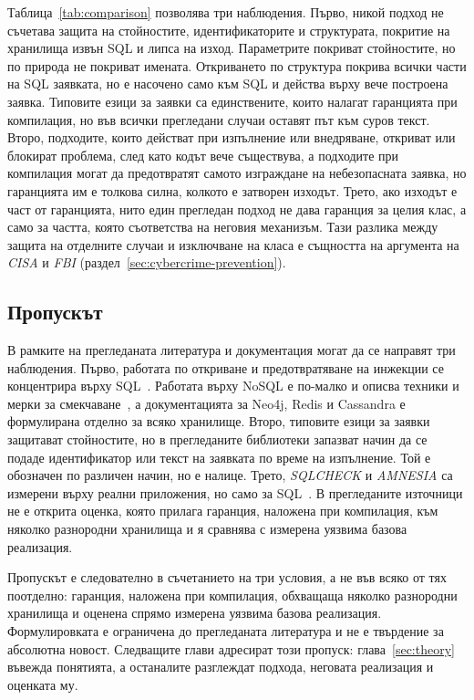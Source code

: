 Таблица~\ref{tab:comparison} позволява три наблюдения. Първо, никой подход не
съчетава защита на стойностите, идентификаторите и структурата, покритие на хранилища
извън SQL и липса на изход. Параметрите покриват стойностите, но по природа не покриват
имената. Откриването по структура покрива всички части на SQL заявката, но е насочено
само към SQL и действа върху вече построена заявка. Типовите езици за заявки са
единствените, които налагат гаранцията при компилация, но във всички прегледани
случаи оставят път към суров текст. Второ, подходите, които действат при изпълнение
или внедряване, откриват или блокират проблема, след като кодът вече съществува, а
подходите при компилация могат да предотвратят самото изграждане на небезопасната
заявка, но гаранцията им е толкова силна, колкото е затворен изходът. Трето, ако
изходът е част от гаранцията, нито един прегледан подход не дава гаранция за целия
клас, а само за частта, която съответства на неговия механизъм. Тази разлика между
защита на отделните случаи и изключване на класа е същността на аргумента на
\textit{CISA} и \textit{FBI} (раздел~\ref{sec:cybercrime-prevention}).

\subsection{Пропускът}
\label{sec:existing-gap}

В рамките на прегледаната литература и документация могат да се направят три
наблюдения. Първо, работата по откриване и предотвратяване на инжекции се
концентрира върху SQL~\cite{su2006essence,halfond2006classification,halfond2005amnesia,bandhakavi2007candid,boyd2004sqlrand}.
Работата върху NoSQL е по-малко и описва техники и мерки за смекчаване~\cite{ron2015nosql,ron2016nosql},
а документацията за Neo4j, Redis и Cassandra е формулирана отделно за всяко
хранилище. Второ, типовите езици за заявки защитават стойностите, но в прегледаните
библиотеки запазват начин да се подаде идентификатор или текст на заявката по време на
изпълнение. Той е обозначен по различен начин, но е налице. Трето, \textit{SQLCHECK} и
\textit{AMNESIA} са измерени върху реални приложения, но само за SQL~\cite{su2006essence,halfond2005amnesia}.
В прегледаните източници не е открита оценка, която прилага гаранция, наложена при
компилация, към няколко разнородни хранилища и я сравнява с измерена уязвима базова
реализация.

Пропускът е следователно в съчетанието на три условия, а не във всяко от тях
поотделно: гаранция, наложена при компилация, обхващаща няколко разнородни хранилища
и оценена спрямо измерена уязвима базова реализация. Формулировката е ограничена до
прегледаната литература и не е твърдение за абсолютна новост. Следващите глави
адресират този пропуск: глава~\ref{sec:theory} въвежда понятията, а останалите
разглеждат подхода, неговата реализация и оценката му.
